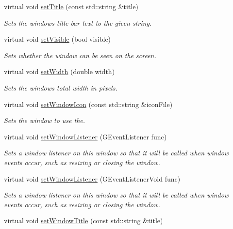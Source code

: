\begin{DoxyCompactItemize}
virtual void \mbox{\hyperlink{classGWindow_abc79cf0667bbb5c93fca3f01b52c7b57}{set\+Title}} (const std\+::string \&title)
\begin{DoxyCompactList}\small\item\em Sets the window\textquotesingle{}s title bar text to the given string. \end{DoxyCompactList}\item 
virtual void \mbox{\hyperlink{classGWindow_a18e44e30b31525a243960ca3928125aa}{set\+Visible}} (bool visible)
\begin{DoxyCompactList}\small\item\em Sets whether the window can be seen on the screen. \end{DoxyCompactList}\item 
virtual void \mbox{\hyperlink{classGWindow_aa3f3fba4cb131baa8696ba01e3bceca1}{set\+Width}} (double width)
\begin{DoxyCompactList}\small\item\em Sets the window\textquotesingle{}s total width in pixels. \end{DoxyCompactList}\item 
virtual void \mbox{\hyperlink{classGWindow_ab21f6abd314b7ffd3ccf7b6e18ac18cb}{set\+Window\+Icon}} (const std\+::string \&icon\+File)
\begin{DoxyCompactList}\small\item\em Sets the window to use the. \end{DoxyCompactList}\item 
virtual void \mbox{\hyperlink{classGWindow_adbb687462d07ac5bd49f3861e4356838}{set\+Window\+Listener}} (G\+Event\+Listener func)
\begin{DoxyCompactList}\small\item\em Sets a window listener on this window so that it will be called when window events occur, such as resizing or closing the window. \end{DoxyCompactList}\item 
virtual void \mbox{\hyperlink{classGWindow_a58b90463b205519917d5f68bdf068815}{set\+Window\+Listener}} (G\+Event\+Listener\+Void func)
\begin{DoxyCompactList}\small\item\em Sets a window listener on this window so that it will be called when window events occur, such as resizing or closing the window. \end{DoxyCompactList}\item 
virtual void \mbox{\hyperlink{classGWindow_a1c06b2b64d56394d6d77aa5b627910e2}{set\+Window\+Title}} (const std\+::string \&title)

\end{DoxyCompactItemize}
